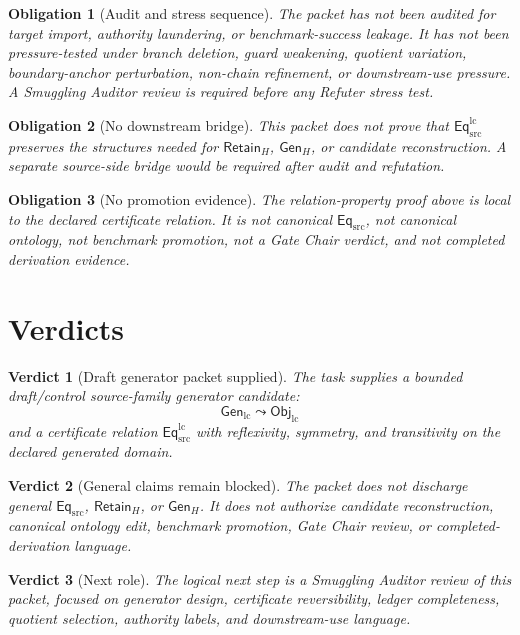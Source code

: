\documentclass[11pt]{article}
\newcommand{\EqSrc}{\mathsf{Eq}_{\mathrm{src}}}
\newcommand{\EqLC}{\mathsf{Eq}_{\mathrm{src}}^{\mathrm{lc}}}
\newcommand{\ObjLC}{\mathsf{Obj}_{\mathrm{lc}}}
\newcommand{\GenLC}{\mathsf{Gen}_{\mathrm{lc}}}
\newcommand{\RetainH}{\mathsf{Retain}_{H}}
\newcommand{\GenH}{\mathsf{Gen}_{H}}
\newtheorem{obligation}{Obligation}
\newtheorem{verdict}{Verdict}
\begin{document}
\begin{obligation}[Audit and stress sequence]
The packet has not been audited for target import, authority laundering,
or benchmark-success leakage. It has not been pressure-tested under
branch deletion, guard weakening, quotient variation, boundary-anchor
perturbation, non-chain refinement, or downstream-use pressure. A
Smuggling Auditor review is required before any Refuter stress test.
\end{obligation}

\begin{obligation}[No downstream bridge]
This packet does not prove that \(\EqLC\) preserves the structures
needed for \(\RetainH\), \(\GenH\), or candidate reconstruction. A
separate source-side bridge would be required after audit and refutation.
\end{obligation}

\begin{obligation}[No promotion evidence]
The relation-property proof above is local to the declared certificate
relation. It is not canonical \(\EqSrc\), not canonical ontology, not
benchmark promotion, not a Gate Chair verdict, and not completed
derivation evidence.
\end{obligation}

\section{Verdicts}

\begin{verdict}[Draft generator packet supplied]
The task supplies a bounded draft/control source-family generator
candidate:
\[
    \GenLC \leadsto \ObjLC
\]
and a certificate relation \(\EqLC\) with reflexivity, symmetry, and
transitivity on the declared generated domain.
\end{verdict}

\begin{verdict}[General claims remain blocked]
The packet does not discharge general \(\EqSrc\), \(\RetainH\), or
\(\GenH\). It does not authorize candidate reconstruction, canonical
ontology edit, benchmark promotion, Gate Chair review, or
completed-derivation language.
\end{verdict}

\begin{verdict}[Next role]
The logical next step is a Smuggling Auditor review of this packet,
focused on generator design, certificate reversibility, ledger
completeness, quotient selection, authority labels, and downstream-use
language.
\end{verdict}
\end{document}
